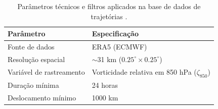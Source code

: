 \begin{table}[ht]
\centering
\caption[Parâmetros e filtros da base de trajetórias]{Parâmetros técnicos e filtros aplicados na base de dados de trajetórias \citep{gramcianinov2019properties}.}
\label{tab:tracking_params}
\begin{tabular*}{\textwidth}{@{\extracolsep{\fill}}ll}
\hline
Parâmetro & Especificação \\ 
\hline
Fonte de dados & ERA5 (ECMWF) \\
Resolução espacial & $\sim$31 km ($0.25^\circ \times 0.25^\circ$) \\
Variável de rastreamento & Vorticidade relativa em 850 hPa ($\zeta_{850}$) \\
Duração mínima & 24 horas \\
Deslocamento mínimo & 1000 km \\ 
\hline
\end{tabular*}
\end{table}